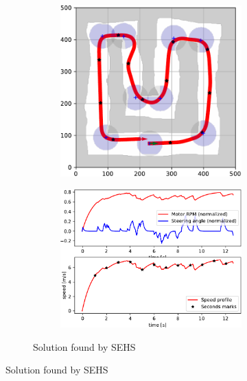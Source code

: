 \begin{figure}[!tbp]
	\vspace{0.75cm}

	\begin{subfigure}[t]{\textwidth}
		\begin{subfigure}[t]{0.45\textwidth}
			\includegraphics[width=\textwidth]{../img/experiments/u-sehs-trajectory}
		\end{subfigure}
		\hfill
		\begin{subfigure}[t]{0.45\textwidth}
			\includegraphics[width=\textwidth]{../img/experiments/u-sehs-actuators}
		\end{subfigure}
		\caption{Solution found by SEHS}
		\label{fig:u-sehs}
	\end{subfigure}
	

\end{figure}
